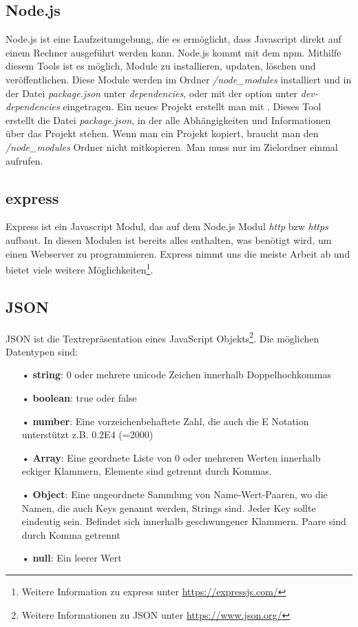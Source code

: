 \subsection{Node.js}
\label{sec:vor-node}
Node.js ist eine Laufzeitumgebung, die es ermöglicht, dass Javascript direkt auf einem Rechner ausgeführt werden kann. Node.js kommt mit dem \ac{npm}. Mithilfe diesem Tools ist es möglich, Module zu installieren, updaten, löschen und veröffentlichen. Diese Module werden im Ordner \textit{/node\_modules} installiert und in der Datei \textit{package.json} unter \textit{dependencies}, oder mit der option  unter \textit{dev-dependencies} eingetragen. Ein neues Projekt erstellt man mit . Dieses Tool erstellt die Datei \textit{package.json}, in der alle Abhängigkeiten und Informationen über das Projekt stehen. Wenn man ein Projekt kopiert, braucht man den \textit{/node\_modules} Ordner nicht mitkopieren. Man muss nur im Zielordner einmal  aufrufen.

\subsection{express}
\label{sec:vor-express}
Express ist ein Javascript Modul, das auf dem Node.js Modul \textit{http} bzw \textit{https} aufbaut. In diesen Modulen ist bereits alles enthalten, was benötigt wird, um einen Webserver zu programmieren. Express nimmt uns die meiste Arbeit ab und bietet viele weitere Möglichkeiten\footnote{Weitere Information zu express unter \url{https://expressjs.com/}}.

\subsection{JSON}
\label{sec:vor-json}
\ac{JSON} ist die Textrepräsentation eines JavaScript Objekts\footnote{Weitere Informationen zu \ac{JSON} unter \url{https://www.json.org/}}. Die möglichen Datentypen sind:

\begin{itemize}
\item[•] \textbf{string}: 0 oder mehrere unicode Zeichen innerhalb Doppelhochkommas
\item[•] \textbf{boolean}: true oder false
\item[•] \textbf{number}: Eine vorzeichenbehaftete Zahl, die auch die E Notation unterstützt z.B. 0.2E4 (=2000)
\item[•] \textbf{Array}: Eine geordnete Liste von 0 oder mehreren Werten innerhalb eckiger Klammern, Elemente sind getrennt durch Kommas.
\item[•] \textbf{Object}: Eine ungeordnete Sammlung von Name-Wert-Paaren, wo die Namen, die auch Keys genannt werden, Strings sind. Jeder Key sollte eindeutig sein. Befindet sich innerhalb geschwungener Klammern. Paare sind durch Komma getrennt
\item[•] \textbf{null}: Ein leerer Wert
\end{itemize}

